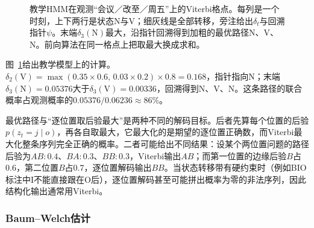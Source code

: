 \begin{figure}[htbp]
  \centering
  
  \caption{教学HMM在观测“会议／改至／周五”上的Viterbi格点。每列是一个时刻，上下两行是状态N与V；细灰线是全部转移，旁注给出$\delta_t$与回溯指针$\psi$。末端$\delta_3(\mathrm N)$最大，沿指针回溯得到加粗的最优路径N、V、N。前向算法在同一格点上把取最大换成求和。}
  \label{fig:nlp-classical-hmm-trellis}
\end{figure}

图~\ref{fig:nlp-classical-hmm-trellis}给出教学模型上的计算。$\delta_2(\mathrm V)=\max(0.35\times0.6,\,0.03\times0.2)\times0.8=0.168$，指针指向N；末端$\delta_3(\mathrm N)=0.05376$大于$\delta_3(\mathrm V)=0.00336$，回溯得到N、V、N。这条路径的联合概率占观测概率的$0.05376/0.06236\approx86\%$。

最优路径与“逐位置取后验最大”是两种不同的解码目标。后者先算每个位置的后验$p(z_t=j\mid o)$，再各自取最大，它最大化的是期望的逐位置正确数，而Viterbi最大化整条序列完全正确的概率。二者可能给出不同结果：设某个两位置问题的路径后验为$AB:0.4$、$BA:0.3$、$BB:0.3$，Viterbi输出$AB$；而第一位置的边缘后验$B$占$0.6$，第二位置$B$占$0.7$，逐位置解码输出$BB$。当状态转移带有硬约束时（例如BIO标注中I不能直接跟在O后），逐位置解码甚至可能拼出概率为零的非法序列，因此结构化输出通常用Viterbi。

\subsubsection{Baum--Welch估计}
\label{sec:nlp-classical-baum-welch}


